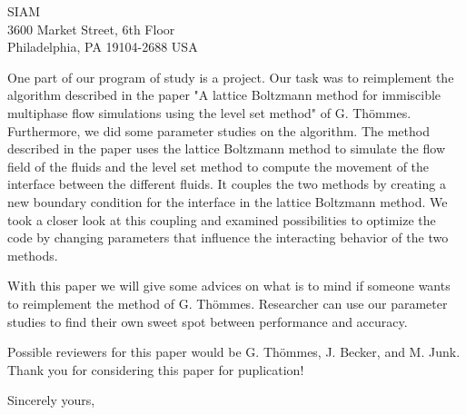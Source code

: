 \documentclass[11pt]{letter} %
\begin{document}
\begin{letter}{SIAM \\
3600 Market Street, 6th Floor \\
Philadelphia, PA 19104-2688 USA}

One part of our program of study is a project. Our task was to reimplement the algorithm described in the paper "A lattice Boltzmann method for immiscible multiphase flow simulations using the level set method" of G. Th\"ommes. Furthermore, we did some parameter studies on the algorithm. The method described in the paper uses the lattice Boltzmann method to simulate the flow field of the fluids and the level set method to compute the movement of the interface between the different fluids. It couples the two methods by creating a new boundary condition for the interface in the lattice Boltzmann method. We took a closer look at this coupling and examined possibilities to optimize the code by changing parameters that influence the interacting behavior of the two methods.


With this paper we will give some advices on what is to mind if someone wants to reimplement the method of G. Th\"ommes. Researcher can use our parameter studies to find their own sweet spot between performance and accuracy.


Possible reviewers for this paper would be G. Th\"ommes, J. Becker, and M. Junk. Thank you for considering this paper for puplication!

\closing{Sincerely yours,}




\end{letter}
\end{document}
